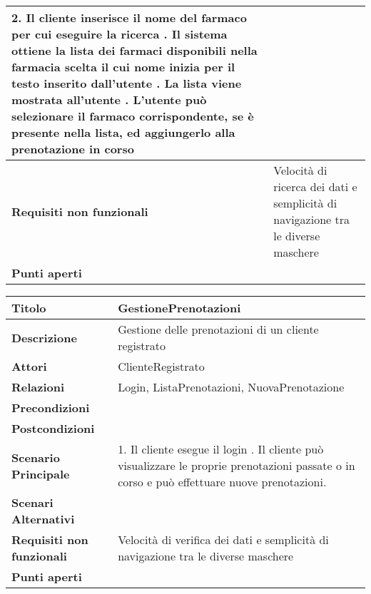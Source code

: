 \begin{tabular} {|P{4.5cm}|P{12.5cm}|}
        2. Il cliente inserisce il nome del farmaco per cui eseguire la ricerca . Il sistema ottiene la lista dei farmaci disponibili nella farmacia scelta il cui nome inizia per il testo inserito dall'utente . La lista viene mostrata all'utente . L'utente può selezionare il farmaco corrispondente, se è presente nella lista, ed aggiungerlo alla prenotazione in corso \\
  \hline
    \textbf{Requisiti non funzionali} & Velocità di ricerca dei dati e semplicità di navigazione tra le diverse maschere\\
  \hline
    \textbf{Punti aperti} &\\
  \hline
\end{tabular}
\hfill
\break

\begin{tabular} {|P{4.5cm}|P{12.5cm}|}\hline
  \textbf{Titolo} & GestionePrenotazioni\\
  \hline
    \textbf{Descrizione} & Gestione delle prenotazioni di un cliente registrato\\
  \hline
    \textbf{Attori} & ClienteRegistrato\\
  \hline
    \textbf{Relazioni} & Login, ListaPrenotazioni, NuovaPrenotazione\\
  \hline
    \textbf{Precondizioni} &\\
  \hline
    \textbf{Postcondizioni} &\\
  \hline
    \textbf{Scenario Principale} & 1. Il cliente esegue il login . Il
    cliente può visualizzare le proprie prenotazioni passate o in corso e può
    effettuare nuove prenotazioni.\\
  \hline
    \textbf{Scenari Alternativi} &\\
  \hline
    \textbf{Requisiti non funzionali} & Velocità di verifica dei dati e
    semplicità di navigazione tra le diverse maschere\\
  \hline
    \textbf{Punti aperti} &\\
  \hline
\end{tabular}
\hfill
\break

